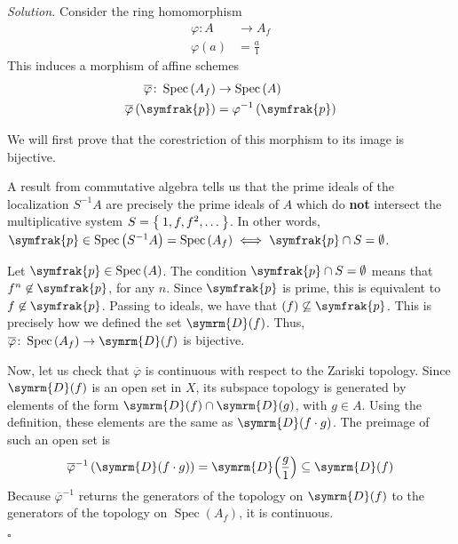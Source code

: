 \documentclass[a4paper, 12pt]{article}
\theoremstyle{definition}
\newenvironment{solution}
    {\addvspace{8pt}\par\noindent\textit{Solution.}}
    {\hfill\(\square\)}
\newcommand*{\Spec}[1]{\operatorname{Spec}\left(#1\right)}
\newcommand*{\distinguished}[1]{\symrm{D}\!\left(#1\right)}
\newcommand*{\primeideal}[1]{\symfrak{#1}}
\begin{document}
\begin{solution}
Consider the ring homomorphism
\begin{align*}
    \varphi \colon A &\to A_f \\
    \varphi(a) &= \frac{a}{1}
\end{align*}
This induces a morphism of affine schemes
\begin{align*}
    \overline{\varphi} \colon \Spec{A_f} &\to \Spec{A} \\
    \overline{\varphi} \left(\primeideal{p}\right) &= \varphi^{-1} \left(\primeideal{p}\right)
\end{align*}

We will first prove that the corestriction of this morphism to its image is bijective.

A result from commutative algebra tells us that the prime ideals of the localization \(S^{-1} A\) are precisely the prime ideals of \(A\) which do \textbf{not} intersect the multiplicative system \(S = \Set{ 1, f, f^2, \dots }\). In other words, \(\primeideal{p} \in \Spec{S^{-1} A} = \Spec{A_f} \iff \primeideal{p} \cap S = \emptyset\).

Let \(\primeideal{p} \in \Spec{A}\). The condition \(\primeideal{p} \cap S = \emptyset\) means that \(f^n \not\in \primeideal{p}\), for any \(n\). Since \(\primeideal{p}\) is prime, this is equivalent to \(f \not\in \primeideal{p}\). Passing to ideals, we have that \(\left(f\right) \not\subseteq \primeideal{p}\). This is precisely how we defined the set \(\distinguished{f}\). Thus, \(\overline{\varphi} \colon \Spec{A_f} \to \distinguished{f}\) is bijective.

Now, let us check that \(\overline{\varphi}\) is continuous with respect to the Zariski topology. Since \(\distinguished{f}\) is an open set in \(X\), its subspace topology is generated by elements of the form \(\distinguished{f} \cap \distinguished{g}\), with \(g \in A\). Using the definition, these elements are the same as \(\distinguished{f \cdot g}\). The preimage of such an open set is
\[
\overline{\varphi}^{-1} \left(\distinguished{f \cdot g}\right) = \distinguished{\frac{g}{1}} \subseteq \distinguished{f}
\]
Because \(\overline{\varphi}^{-1}\) returns the generators of the topology on \(\distinguished{f}\) to the generators of the topology on \(\Spec{A_f}\), it is continuous.


\end{solution}
\end{document}
